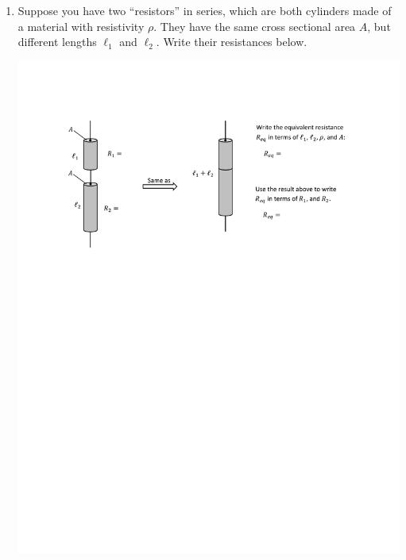 \begin{enumerate}[labparts]

\item Suppose you have two ``resistors'' in series, which are both cylinders made of a material with resistivity $\rho$.  They have the same cross sectional area $A$, but different lengths $\ell_1$ and $\ell_2$.  Write their resistances below.

\begin{center}
\includegraphics[scale=0.95]{resistance_ideal_meters/series_resistors.pdf}
\end{center}


\end{enumerate}
